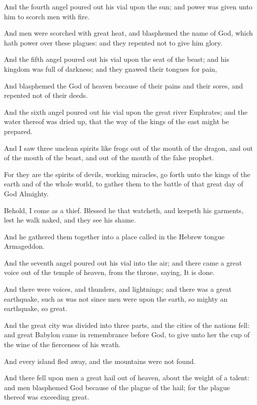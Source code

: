 {And the
fourth
angel poured
out
his
vial
upon the
sun;
and
power was
given unto
him to
scorch
men
with
fire.

And
men were
scorched with
great
heat,
and
blasphemed the
name of
God,
which
hath
power
over
these
plagues:
and they
repented
not to
give
him
glory.

And the
fifth
angel poured
out
his
vial
upon the
seat of the
beast;
and
his
kingdom
was full of
darkness;
and they
gnawed
their
tongues
for
pain,

And
blasphemed the
God of
heaven
because of
their
pains
and
their
sores,
and
repented
not
of
their
deeds.

And the
sixth
angel poured
out
his
vial
upon the
great
river
Euphrates;
and the
water
thereof was dried
up,
that the
way of the
kings
of the
east might be
prepared.

And I
saw
three
unclean
spirits
like
frogs
{} out
of the
mouth of the
dragon,
and out
of the
mouth of the
beast,
and out
of the
mouth of the false
prophet.

For they
are the
spirits of
devils,
working
miracles,
{} go
forth
unto the
kings of the
earth
and of the
whole
world, to
gather
them
to the
battle of
that
great
day of
God
Almighty.

Behold, I
come
as a
thief.
Blessed
{}
he that
watcheth,
and
keepeth
his
garments,
lest he
walk
naked,
and they
see
his
shame.

And he
gathered
them
together
into a
place
called in the Hebrew
tongue
Armageddon.

And the
seventh
angel poured
out
his
vial
into the
air;
and there
came a
great
voice
out of the
temple of
heaven,
from the
throne,
saying, It is
done.

And there
were
voices,
and
thunders,
and
lightnings;
and there
was a
great
earthquake, such
as
was
not
since
men
were
upon the
earth, so
mighty an
earthquake,
{}
so
great.

And the
great
city was
divided
into
three
parts,
and the
cities of the
nations
fell:
and
great
Babylon came in
remembrance
before
God, to
give unto
her the
cup of the
wine of the
fierceness of
his
wrath.

And
every
island fled
away,
and the
mountains
were
not
found.

And there
fell
upon
men a
great
hail out
of
heaven,
{}
about the weight of a
talent:
and
men
blasphemed
God because
of the
plague of the
hail;
for the
plague
thereof
was
exceeding
great.




}
